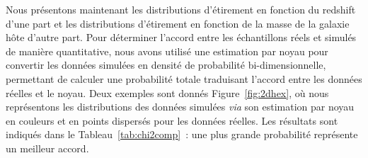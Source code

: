\documentclass[../main/main.tex]{subfiles}
\begin{document}
Nous présentons maintenant les distributions d'étirement en fonction du redshift
d'une part et les distributions d'étirement en fonction de la masse de la
galaxie hôte d'autre part. Pour déterminer l'accord entre les échantillons réels
et simulés de manière quantitative, nous avons utilisé une estimation par noyau
pour convertir les données simulées en densité de probabilité bi-dimensionnelle,
permettant de calculer une probabilité totale traduisant l'accord entre les
données réelles et le noyau. Deux exemples sont donnés Figure~\ref{fig:2dhex},
où nous représentons les distributions des données simulées \textit{via} son
estimation par noyau en couleurs et en points dispersés pour les données
réelles. Les résultats sont indiqués dans le Tableau~\ref{tab:chi2comp}~: une
plus grande probabilité représente un meilleur accord.

\end{document}

